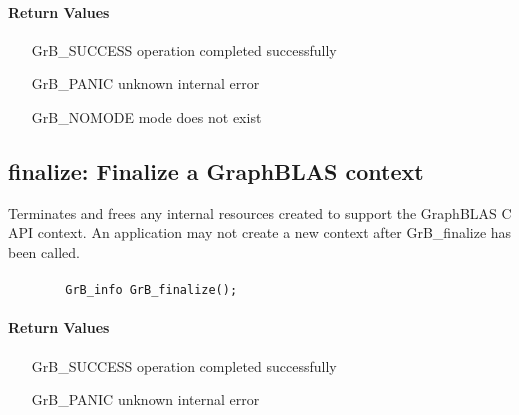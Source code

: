 \paragraph{Return Values}

\begin{itemize}[leftmargin=2.1in]
\item[{\sf GrB\_SUCCESS}]        operation completed successfully
\item[{\sf GrB\_PANIC}]          unknown internal error
\item[{\sf GrB\_NOMODE}]         mode does not exist
\end{itemize}


\subsection{{\sf finalize}: Finalize a GraphBLAS context}

Terminates and frees any internal resources created to 
support the GraphBLAS C API context.
An application may not create a new context after 
{\sf GrB\_finalize} has been called.

\paragraph{\syntax}

\begin{verbatim}
        GrB_info GrB_finalize();
\end{verbatim}

\paragraph{Return Values}

\begin{itemize}[leftmargin=2.1in]
\item[{\sf GrB\_SUCCESS}]        operation completed successfully
\item[{\sf GrB\_PANIC}]          unknown internal error
\end{itemize}

